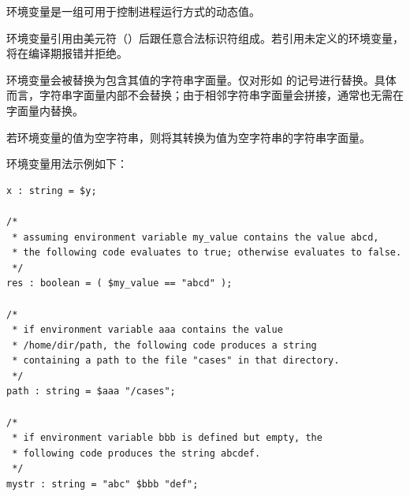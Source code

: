环境变量是一组可用于控制进程运行方式的动态值。

环境变量引用由美元符（\cmd{\$}）后跟任意合法标识符组成。若引用未定义的环境变量，将在编译期报错并拒绝。

环境变量会被替换为包含其值的字符串字面量。仅对形如  的记号进行替换。具体而言，字符串字面量内部不会替换；由于相邻字符串字面量会拼接，通常也无需在字面量内替换。

\begin{noteBox}
若环境变量的值为空字符串，则将其转换为值为空字符串的字符串字面量。
\end{noteBox}

环境变量用法示例如下：
\begin{lstlisting}[style=pxl]
x : string = $y;

/*
 * assuming environment variable my_value contains the value abcd,
 * the following code evaluates to true; otherwise evaluates to false.
 */
res : boolean = ( $my_value == "abcd" );

/*
 * if environment variable aaa contains the value
 * /home/dir/path, the following code produces a string
 * containing a path to the file "cases" in that directory.
 */
path : string = $aaa "/cases";

/*
 * if environment variable bbb is defined but empty, the
 * following code produces the string abcdef.
 */
mystr : string = "abc" $bbb "def";
\end{lstlisting}
